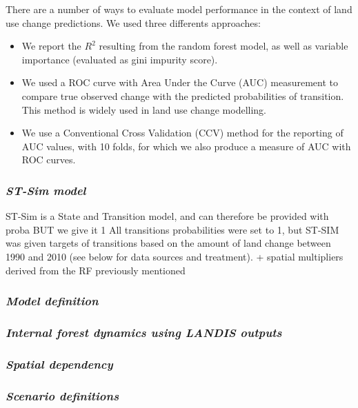 There are a number of ways to evaluate model performance in the context of land use change predictions. We used three differents approaches:
\begin{itemize}
  \item We report the $R^{2}$ resulting from the random forest model, as well as variable importance (evaluated as gini impurity score).
  \item We used a ROC curve with Area Under the Curve (AUC) measurement to compare true observed change with the predicted probabilities of transition. This method is widely used in land use change modelling.
  \item We use a Conventional Cross Validation (CCV) method for the reporting of AUC values, with 10 folds, for which we also produce a measure of AUC with ROC curves.\\
\end{itemize}

\subsubsection*{\textit{ST-Sim model}}

ST-Sim is a State and Transition model, and can therefore be provided with proba BUT we give it 1 All transitions probabilities were set to 1, but ST-SIM was given targets of transitions based on the amount of land change between 1990 and 2010 (see below for data sources and treatment). + spatial multipliers derived from the RF previously mentioned

\subsubsection*{\textit{Model definition}}


\subsubsection*{\textit{Internal forest dynamics using LANDIS outputs}}


\subsubsection*{\textit{Spatial dependency}}

\subsubsection*{\textit{Scenario definitions}}


